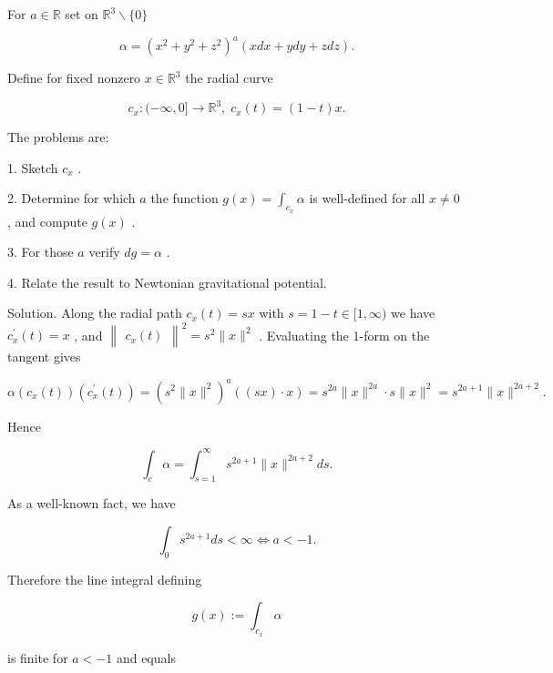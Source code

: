 \documentclass[10pt]{article}
\begin{document}
\begin{problem}[title=PROBLEM 6 (8 POINTS)]
For \(a \in  \mathbb{R}\) set on \({\mathbb{R}}^{3} \smallsetminus  \{ 0\}\)

\[
\alpha  = {\left( {x}^{2} + {y}^{2} + {z}^{2}\right) }^{a}\left( {{xdx} + {ydy} + {zdz}}\right) .
\]

Define for fixed nonzero \(x \in  {\mathbb{R}}^{3}\) the radial curve

\[
{c}_{x} : ( - \infty ,0\rbrack  \rightarrow  {\mathbb{R}}^{3},\;{c}_{x}\left( t\right)  = \left( {1 - t}\right) x.
\]

The problems are:

1. Sketch \({c}_{x}\) .

2. Determine for which \(a\) the function \(g\left( x\right)  = {\int }_{{c}_{x}}\alpha\) is well-defined for all \(x \neq  0\) , and compute \(g\left( x\right)\) .

3. For those \(a\) verify \({dg} = \alpha\) .

4. Relate the result to Newtonian gravitational potential.
\end{problem}

Solution. Along the radial path \({c}_{x}\left( t\right)  = {sx}\) with \(s = 1 - t \in  \lbrack 1,\infty )\) we have \({c}_{x}^{\prime }\left( t\right)  = x\) , and \({\begin{Vmatrix}{c}_{x}\left( t\right) \end{Vmatrix}}^{2} = {s}^{2}\parallel x{\parallel }^{2}\) . Evaluating the 1-form on the tangent gives

\[
\alpha \left( {{c}_{x}\left( t\right) }\right) \left( {{c}_{x}^{\prime }\left( t\right) }\right)  = {\left( {s}^{2}\parallel x{\parallel }^{2}\right) }^{a}\left( {\left( {sx}\right)  \cdot  x}\right)  = {s}^{2a}\parallel x{\parallel }^{2a} \cdot  s\parallel x{\parallel }^{2} = {s}^{{2a} + 1}\parallel x{\parallel }^{{2a} + 2}.
\]

Hence

\[
{\int }_{c}\alpha  = {\int }_{s = 1}^{\infty }{s}^{{2a} + 1}\parallel x{\parallel }^{{2a} + 2}{ds}.
\]

As a well-known fact, we have

\[
{\int }_{0}{s}^{{2a} + 1}{ds} < \infty  \Leftrightarrow  a <  - 1.
\]

Therefore the line integral defining

\[
g\left( x\right)  \mathrel{\text{ := }} {\int }_{{c}_{x}}\alpha
\]

is finite for \(a <  - 1\) and equals
\end{document}
